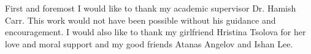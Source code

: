 First and foremost I would like to thank my academic supervisor Dr. Hamish Carr. This work would not have been possible without his guidance and encouragement. I would also like to thank my girlfriend Hristina Tsolova for her love and moral support and my good friends Atanas Angelov and Ishan Lee.

%
%
%
